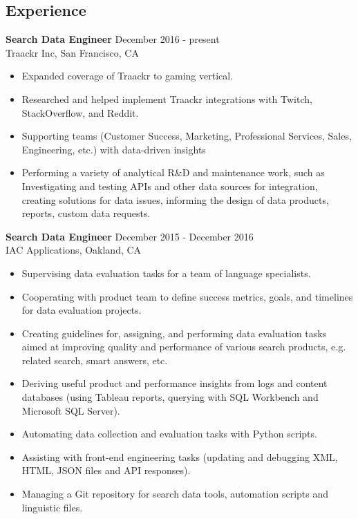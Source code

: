 \documentclass[10pt,line,letterpaper]{res}
\begin{document}
\address{2024 Vine St Apt 2D, Berkeley, CA}
\address{sofya.mulenok@gmail.com or (415)-359-3454}

\begin{resume}
\pagestyle{empty}
\section{Experience}
    {\bf Search Data Engineer} \hfill December 2016 - present \\
    Traackr Inc, San Francisco, CA
    \begin{itemize} \itemsep -2pt
    \item Expanded coverage of Traackr to gaming vertical. 
    \item Researched and helped implement Traackr integrations with Twitch, StackOverflow, and Reddit.
    \item Supporting teams (Customer Success, Marketing, Professional Services, Sales, Engineering, etc.) with data-driven insights
    \item Performing a variety of analytical R&D and maintenance work, such as Investigating and testing APIs and other data sources for integration, creating solutions for data issues, informing the design of data products, reports, custom data requests.
    \end{itemize}

    {\bf Search Data Engineer} \hfill December 2015 - December 2016 \\
    IAC Applications, Oakland, CA
    \begin{itemize} \itemsep -2pt
    \item Supervising data evaluation tasks for a team of language specialists.
    \item Cooperating with product team to define success metrics, goals, and timelines for data evaluation projects.
    \item Creating guidelines for, assigning, and performing data evaluation tasks aimed at improving quality and performance of various search products, e.g. related search, smart answers, etc.
    \item Deriving useful product and performance insights from logs and content databases (using Tableau reports, querying with SQL Workbench and Microsoft SQL Server).
    \item Automating data collection and evaluation tasks with Python scripts.
    \item Assisting with front-end engineering tasks (updating and debugging XML, HTML, JSON files and API responses).
    \item Managing a Git repository for search data tools, automation scripts and linguistic files.
    \end{itemize}
    

\end{resume}
\end{document}
